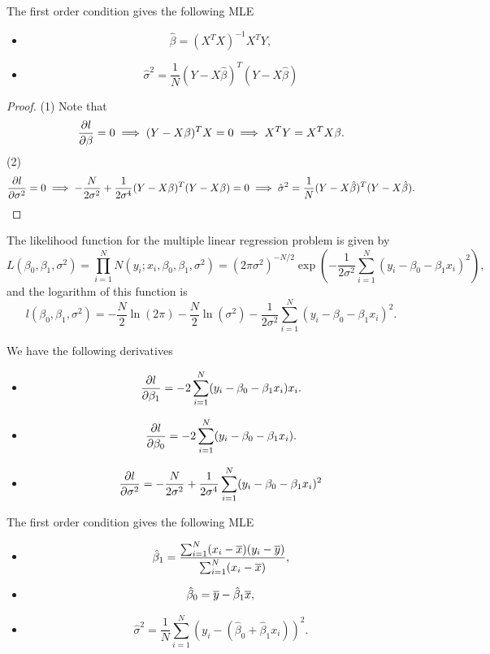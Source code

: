 \begin{refsection}
\begin{theorem}
The first order condition gives the following MLE
\begin{itemize}
	\item $$\hat{\beta} = (X^TX)^{-1}X^TY,$$
	\item $$\hat{\sigma}^2 = \frac{1}{N}(Y-X\hat{\beta})^T(Y-X\hat{\beta})$$
\end{itemize}
\end{theorem}
\begin{proof}
(1) Note that 
$$\frac{\partial l}{\partial \beta} = 0\implies (Y-X\beta)^TX = 0\implies X^TY=X^TX\beta.$$
(2)$$\frac{\partial l}{\partial \sigma^2} = 0\implies -\frac{N}{2\sigma^2} + \frac{1}{2\sigma^4}(Y-X\beta)^T(Y-X\beta) = 0\implies \hat{\sigma}^2 = \frac{1}{N}(Y-X\hat{\beta})^T(Y-X\hat{\beta}).$$
\end{proof}


\begin{corollary}
The likelihood function for the multiple linear regression problem is given by	
$$L(\beta_0,\beta_1, \sigma^2) = \prod_{i=1}^{N} N(y_i;x_i,\beta_0,\beta_1, \sigma^2) = (2\pi\sigma^2)^{-N/2}\exp(-\frac{1}{2\sigma^2}\sum_{i=1}^{N}(y_i-\beta_0-\beta_1x_i)^2),$$
and the logarithm of this function is
$$l(\beta_0,\beta_1, \sigma^2) = -\frac{N}{2}\ln(2\pi)-\frac{N}{2}\ln(\sigma^2) -\frac{1}{2\sigma^2}\sum_{i=1}^{N}(y_i-\beta_0-\beta_1x_i)^2.$$

We have the following derivatives
\begin{itemize}
	\item 
	$$\frac{\partial l}{\partial \beta_1} = -2\sum_{i=1}^{N}(y_i-\beta_0-\beta_1x_i)x_i.$$
	\item
	$$\frac{\partial l}{\partial \beta_0} = -2\sum_{i=1}^{N}(y_i-\beta_0-\beta_1x_i).$$
	\item 
	$$\frac{\partial l}{\partial \sigma^2} = -\frac{N}{2\sigma^2} + \frac{1}{2\sigma^4}\sum_{i=1}^{N}(y_i-\beta_0-\beta_1x_i)^2 $$
\end{itemize}	

The first order condition gives the following MLE
\begin{itemize}
	\item $$\hat{\beta}_1 = \frac{\sum_{i=1}^{N} (x_i-\overline{x})(y_i-\overline{y})}{\sum_{i=1}^{N}(x_i-\overline{x})},$$
	\item $$\hat{\beta}_0 = \overline{y} - \hat{\beta}_1\overline{x},$$
	\item $$\hat{\sigma}^2 = \frac{1}{N}\sum_{i=1}^{N}(y_i-(\hat{\beta}_0+\hat{\beta}_1x_i))^2.$$
\end{itemize}	
\end{corollary}


\end{refsection}
